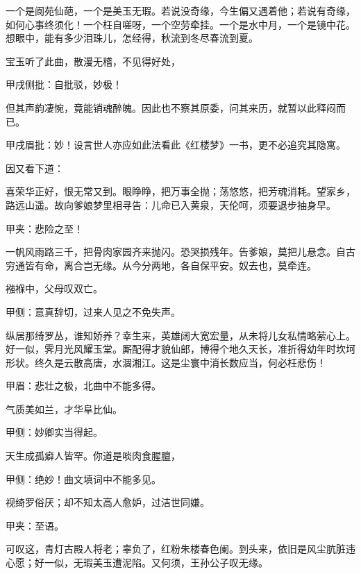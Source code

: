 \begin{qute}
    一个是阆苑仙葩，一个是美玉无瑕。若说没奇缘，今生偏又遇着他；若说有奇缘，如何心事终须化！一个枉自嗟呀，一个空劳牵挂。一个是水中月，一个是镜中花。想眼中，能有多少泪珠儿，怎经得，秋流到冬尽春流到夏。
\end{qute}
\begin{parag}

    宝玉听了此曲，散漫无稽，不见得好处，\begin{note}甲戌侧批：自批驳，妙极！\end{note}但其声韵凄惋，竟能销魂醉魄。因此也不察其原委，问其来历，就暂以此释闷而已。\begin{note}甲戌眉批：妙！设言世人亦应如此法看此《红楼梦》一书，更不必追究其隐寓。\end{note}因又看下道：
\end{parag}
\begin{qute}
    喜荣华正好，恨无常又到。眼睁睁，把万事全抛；荡悠悠，把芳魂消耗。望家乡，路远山遥。故向爹娘梦里相寻告：儿命已入黄泉，天伦呵，须要退步抽身早。\begin{note}甲夹：悲险之至！\end{note}
\end{qute}
\begin{qute}
    一帆风雨路三千，把骨肉家园齐来抛闪。恐哭损残年。告爹娘，莫把儿悬念。自古穷通皆有命，离合岂无缘。从今分两地，各自保平安。奴去也，莫牵连。
\end{qute}
\begin{qute}
    襁褓中，父母叹双亡。\begin{note}甲侧：意真辞切，过来人见之不免失声。\end{note}纵居那绮罗丛，谁知娇养？幸生来，英雄阔大宽宏量，从未将儿女私情略萦心上。好一似，霁月光风耀玉堂。厮配得才貌仙郎，博得个地久天长，准折得幼年时坎坷形状。终久是云散高唐，水涸湘江。这是尘寰中消长数应当，何必枉悲伤！\begin{note}甲眉：悲壮之极，北曲中不能多得。\end{note}
\end{qute}
\begin{qute}
    气质美如兰，才华阜比仙。\begin{note}甲侧：妙卿实当得起。\end{note}天生成孤癖人皆罕。你道是啖肉食腥膻，\begin{note}甲侧：绝妙！曲文填词中不能多见。\end{note}视绮罗俗厌；却不知太高人愈妒，过洁世同嫌。\begin{note}甲夹：至语。\end{note}可叹这，青灯古殿人将老；辜负了，红粉朱楼春色阑。到头来，依旧是风尘肮脏违心愿；好一似，无瑕美玉遭泥陷。又何须，王孙公子叹无缘。
\end{qute}
